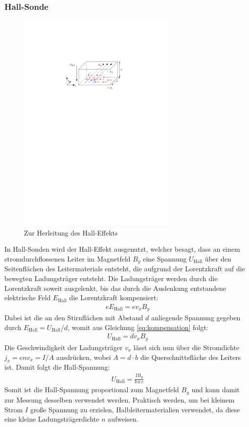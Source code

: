 \documentclass[11pt, a4paper]{article}
\begin{document}
\subsubsection{Hall-Sonde}
\begin{figure}
	\centering
	\includegraphics[width=0.7\textwidth]{./figures/hall_effekt.pdf}
	\caption{Zur Herleitung des Hall-Effekts}
	\label{fig:hall_effekt}
\end{figure}
In Hall-Sonden wird der Hall-Effekt ausgenutzt, welcher besagt, dass an einem stromdurchflossenen Leiter im Magnetfeld $B_y$ eine Spannung $U_\mathrm{Hall}$ über den Seitenflächen des Leitermaterials entsteht, die aufgrund der Lorentzkraft auf die bewegten Ladungsträger entsteht.
Die Ladungsträger werden durch die Lorentzkraft soweit ausgelenkt, bis das durch die Auslenkung entstandene elektrische Feld $E_\mathrm{Hall}$ die Lorentzkraft kompensiert:
\begin{align}
	e E_\mathrm{Hall} = e v_x B_y
	\label{eq:kompensation}
\end{align}
Dabei ist die an den Stirnflächen mit Abstand $d$ anliegende Spannung gegeben durch $E_\mathrm{Hall} = U_\mathrm{Hall} / d$, womit aus Gleichung \ref{eq:kompensation} folgt:
\begin{align}
	U_\mathrm{Hall} = d v_x B_y
\end{align}
Die Geschwindigkeit der Ladungsträger $v_x$ lässt sich nun über die Stromdichte $j_x = e n v_x = I/A$ ausdrücken, wobei $A = d \cdot b$ die Querschnittsfläche des Leiters ist.
Damit folgt die Hall-Spannung:
\begin{align}
	U_\mathrm{Hall} = \frac{I B_y}{b\, n\, e}
\end{align}
Somit ist die Hall-Spannung proportional zum Magnetfeld $B_y$ und kann damit zur Messung desselben verwendet werden.
Praktisch werden, um bei kleinem Strom $I$ große Spannung zu erzielen, Halbleitermaterialien verwendet, da diese eine kleine Ladungsträgerdichte $n$ aufweisen.
\end{document}
